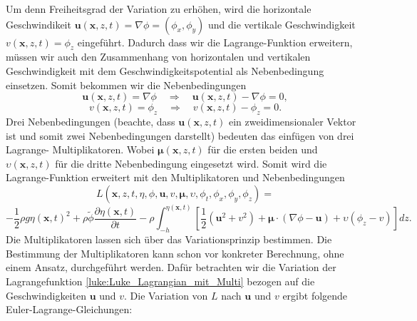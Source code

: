Um denn Freiheitsgrad der Variation zu erhöhen, wird die horizontale Geschwindikeit $\bm{u}(\bm{x},z,t) = \nabla\phi = \left(\phi_x, \phi_y\right)$ und die vertikale Geschwindigkeit $v(\bm{x},z,t) = \phi_z$ eingeführt. 
Dadurch dass wir die Lagrange-Funktion erweitern, müssen wir auch den Zusammenhang von horizontalen und vertikalen Geschwindigkeit mit dem Geschwindigkeitspotential als Nebenbedingung einsetzen.
Somit bekommen wir die Nebenbedingungen
\[
\bm{u}(\bm{x},z,t)
=
\nabla\phi
\quad\Rightarrow\quad
\bm{u}(\bm{x},z,t)
-
\nabla\phi
=
0,
\]
\[
v(\bm{x},z,t)
=
\phi_z
\quad\Rightarrow\quad
v(\bm{x},z,t)
-
\phi_z
=
0.
\]
Drei Nebenbedingungen (beachte, dass $\bm{u}(\bm{x},z,t)$ ein zweidimensionaler Vektor ist und somit zwei Nebenbedingungen darstellt) bedeuten das einfügen von drei Lagrange- Multiplikatoren.
Wobei $\bm{\mu}(\bm{x},z,t)$ für die ersten beiden und $\upsilon(\bm{x},z,t)$ für die dritte Nebenbedingung eingesetzt wird.
Somit wird die Lagrange-Funktion erweitert mit den Multiplikatoren und Nebenbedingungen
\[
L(\bm{x},z,t,\eta,\phi,\bm{u}, v, \bm{\mu},\upsilon,\phi_t,\phi_x,\phi_y,\phi_z)
=
\]
\begin{equation}
	-
	\frac{1}{2}\rho  g \eta(\bm{x},t)^2
	+
	\rho \tilde{\phi} \frac{\partial\eta(\bm{x},t)}{\partial t}
	-
	\rho \int_{-h}^{\eta(\bm{x},t)} \left[ \frac{1}{2} (\bm{u}^2 + v^2) + \bm{\mu} \cdot (\nabla\phi - \bm{u}) + \upsilon  \left(\phi_z - v\right) \right] dz.
	\label{luke:Luke_Lagrangian_mit_Multi}
\end{equation}
Die Multiplikatoren lassen sich über das Variationsprinzip bestimmen.
Die Bestimmung der Multiplikatoren kann schon vor konkreter Berechnung, ohne einem Ansatz, durchgeführt werden.
Dafür betrachten wir die Variation der Lagrangefunktion \eqref{luke:Luke_Lagrangian_mit_Multi} bezogen auf die Geschwindigkeiten $\bm{u}$ und $v$.
Die Variation von $L$ nach $\bm{u}$ und $v$ ergibt folgende Euler-Lagrange-Gleichungen:

